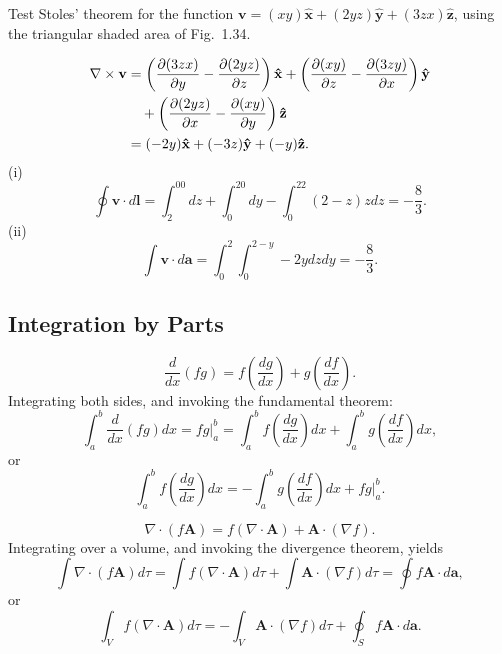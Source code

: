 \begin{prob}[1.34]
    Test Stoles' theorem for the function $\mathbf{v} = (xy)\mathbf{\hat{x}} + (2yz)\mathbf{\hat{y}} + (3zx)\mathbf{\hat{z}}$, using the triangular shaded area of Fig.~1.34.
\end{prob}

\begin{sol}[1.34]
    \begin{equation}
        \begin{aligned}
        \nabla\times\mathbf{v} &= \left(\frac{\partial (3zx)}{\partial y} - \frac{\partial (2yz)}{\partial z}\right)\mathbf{\hat{x}} + \left(\frac{\partial (xy)}{\partial z}-\frac{\partial (3zy)}{\partial x}\right)\mathbf{\hat{y}} \\
        &\quad + \left(\frac{\partial (2yz)}{\partial x}-\frac{\partial (xy)}{\partial y}\right)\mathbf{\hat{z}}\\
        &=(-2y)\mathbf{\hat{x}} + (-3z)\mathbf{\hat{y}} + (-y)\mathbf{\hat{z}}.
        \end{aligned}
    \end{equation}
    \noindent(i)
    \begin{equation}
        \oint\mathbf{v}\cdot d\mathbf{l} = \int_2^00dz + \int_0^20dy - \int_0^22(2-z)zdz =-\frac{8}{3}.
    \end{equation}
    \noindent (ii)
    \begin{equation}
        \int\mathbf{v}\cdot d\mathbf{a} = \int_0^2\int_0^{2-y}-2ydzdy = -\frac{8}{3}.
    \end{equation}
\end{sol}

\subsection{Integration by Parts}
\begin{equation}
    \frac{d}{dx}(fg) = f\left(\frac{dg}{dx}\right) + g\left(\frac{df}{dx}\right).
\end{equation}
Integrating both sides, and invoking the fundamental theorem:
\begin{equation}
    \int_a^b\frac{d}{dx}(fg)dx=fg\Big|_a^b=\int_a^bf\left(\frac{dg}{dx}\right)dx + \int_a^bg\left(\frac{df}{dx}\right)dx,
\end{equation}
or
\begin{equation}
    \int_a^bf\left(\frac{dg}{dx}\right)dx = -\int_a^bg\left(\frac{df}{dx}\right)dx + fg\Big|_a^b.
\end{equation}

\begin{equation}
    \nabla\cdot(f\mathbf{A}) = f(\nabla\cdot\mathbf{A}) + \mathbf{A} \cdot(\nabla f).
\end{equation}
Integrating over a volume, and invoking the divergence theorem, yields
\begin{equation}
    \int\nabla\cdot(f\mathbf{A}) d\tau = \int f(\nabla\cdot\mathbf{A})d\tau + \int\mathbf{A}\cdot(\nabla f)d\tau = \oint f\mathbf{A}\cdot d\mathbf{a},
\end{equation}
or
\begin{equation}
    \int_V f(\nabla\cdot\mathbf{A})d\tau = -\int_V\mathbf{A}\cdot(\nabla f)d\tau + \oint_S f\mathbf{A}\cdot d\mathbf{a}.
\end{equation}

